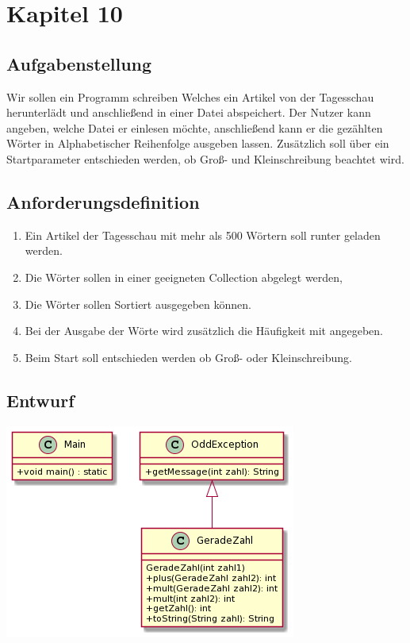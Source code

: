 \section{Kapitel 10}
\subsection{Aufgabenstellung}
Wir sollen ein Programm schreiben Welches ein Artikel von der Tagesschau herunterlädt und
anschlie\ss end in einer Datei abspeichert. Der Nutzer kann angeben, welche Datei er einlesen möchte,
anschlie\ss end kann er die gezählten Wörter in Alphabetischer Reihenfolge ausgeben lassen.
Zusätzlich soll über ein Startparameter entschieden werden, ob Gro\ss -  und Kleinschreibung
beachtet wird.

\subsection{Anforderungsdefinition}
\begin{enumerate}
	\item Ein Artikel der Tagesschau mit mehr als 500 Wörtern soll runter geladen werden.
	\item Die Wörter sollen in einer geeigneten Collection abgelegt werden,
	\item Die Wörter sollen Sortiert ausgegeben können.
	\item Bei der Ausgabe der Wörte wird zusätzlich die Häufigkeit mit angegeben.
	\item Beim Start soll entschieden werden ob Gro\ss - oder Kleinschreibung.
\end{enumerate}

\subsection{Entwurf}
\includegraphics[scale=0.55]{uml/uml_c8_p1.png}

